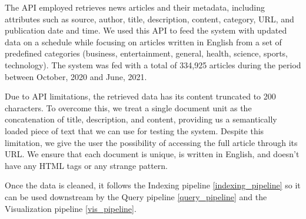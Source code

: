 \documentclass[a4paper]{article}
\begin{document}
\begin{table}[H]
  \centering
  \caption{Competitive intelligence resources on the web \citet{dey2011}.}
  \label{ci_sources}
\end{table}

The API employed retrieves news articles and their metadata, including attributes such as source, author, title, description, content, category, URL, and publication date and time. We used this API to feed the system with updated data on a schedule while focusing on articles written in English from a set of predefined categories (business, entertainment, general, health, science, sports, technology). The system was fed with a total of 334,925 articles during the period between October, 2020 and June, 2021. 

Due to API limitations, the retrieved data has its content truncated to 200 characters. To overcome this, we treat a single document unit as the concatenation of title, description, and content, providing us a semantically loaded piece of text that we can use for testing the system. Despite this limitation, we give the user the possibility of accessing the full article through its URL. We ensure that each document is unique, is written in English, and doesn't have any HTML tags or any strange pattern.

Once the data is cleaned, it follows the Indexing pipeline \ref{indexing_pipeline} so it can be used downstream by the Query pipeline \ref{query_pipeline} and the Visualization pipeline \ref{vis_pipeline}. 
\end{document}
